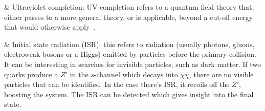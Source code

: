 \begin{easylist}[itemize]
& Ultraviolet completion: UV completion refers to a quantum field theory that, either passes to a more general theory, or is applicable, beyond a cut-off energy that would otherwise apply~\cite{Shore:2007um}.

& Initial state radiation (ISR): this refers to radiation (usually photons, gluons, electroweak bosons or a Higgs) emitted by particles before the primary collision. It can be interesting in searches for invisible particles, such as dark matter. If two quarks produce a $Z'$ in the $s$-channel which decays into $\chi\bar{\chi}$, there are no visible particles that can be identified. In the case there's ISR, it recoils off the $Z'$, boosting the system. The ISR can be detected which gives insight into the final state.

\end{easylist}
